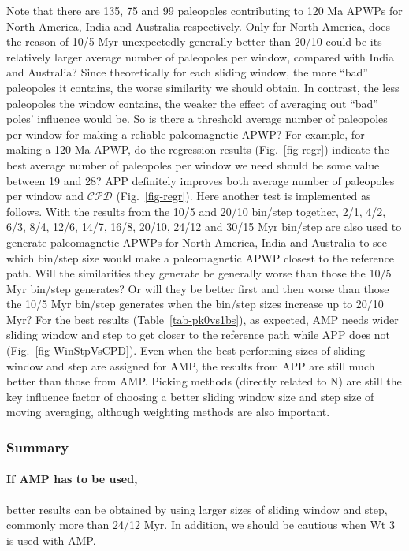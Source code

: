 Note that there are 135, 75 and 99 paleopoles contributing to 120 Ma
APWPs for North America, India and Australia respectively. Only for North
America, does the reason of 10/5 Myr unexpectedly generally better than 20/10
could be its relatively larger average number of paleopoles per window, compared
with India and Australia? Since theoretically for each sliding window, the more
``bad'' paleopoles it contains, the worse similarity we should obtain. In
contrast, the less paleopoles the window contains, the weaker the effect of
averaging out ``bad'' poles' influence would be. So is there a threshold average
number of paleopoles per window for making a reliable paleomagnetic APWP\@? For
example, for making a 120 Ma APWP, do the regression results
(Fig.~\ref{fig-regr}) indicate the best average number of paleopoles per window
we need should be some value between 19 and 28? APP definitely improves both
average number of paleopoles per window and $\mathcal{CPD}$
(Fig.~\ref{fig-regr}). Here another test is implemented as follows. With the
results from the 10/5 and 20/10 bin/step together, 2/1, 4/2, 6/3, 8/4, 12/6,
14/7, 16/8, 20/10, 24/12 and 30/15 Myr bin/step are also used to generate
paleomagnetic APWPs for North America, India and Australia to see which bin/step
size would make a paleomagnetic APWP closest to the reference path. Will the
similarities they generate be generally worse than those the 10/5 Myr bin/step
generates? Or will they be better first and then worse than those the 10/5 Myr
bin/step generates when the bin/step sizes increase up to 20/10 Myr? For the
best results (Table~\ref{tab-pk0vs1bs}), as expected, AMP needs wider sliding
window and step to get closer to the reference path while APP does not
(Fig.~\ref{fig-WinStpVsCPD}). Even when the best performing sizes of sliding
window and step are assigned for AMP, the results from APP are still much better
than those from AMP\@. Picking methods (directly related to N) are still the key
influence factor of choosing a better sliding window size and step size of
moving averaging, although weighting methods are also important.

\subsubsection{Summary}

\paragraph{If AMP has to be used,} better results can be obtained by using
larger sizes of sliding window and step, commonly more than 24/12 Myr. In
addition, we should be cautious when Wt 3 is used with AMP\@.

